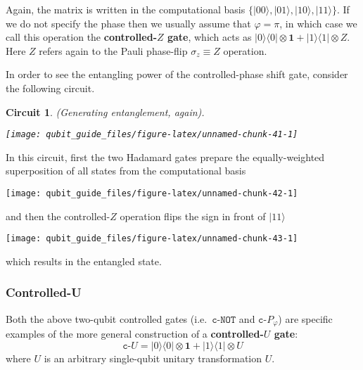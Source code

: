 \documentclass[fleqn]{article}
\newtheorem*{circuit}{Circuit}
\begin{document}
Again, the matrix is written in the computational basis \(\{|00\rangle,|01\rangle,|10\rangle,|11\rangle\}\).
If we do not specify the phase then we usually assume that \(\varphi=\pi\), in which case we call this operation the \textbf{controlled-\(Z\) gate}, which acts as \(|0\rangle\langle 0|\otimes\mathbf{1}+ |1\rangle\langle 1|\otimes Z\).
Here \(Z\) refers again to the Pauli phase-flip \(\sigma_z\equiv Z\) operation.

In order to see the entangling power of the controlled-phase shift gate, consider the following circuit.

\begin{circuit}

(Generating entanglement, again).

\begin{center}\texttt{[image: qubit\_guide\_files/figure-latex/unnamed-chunk-41-1]} \end{center}


\end{circuit}

In this circuit, first the two Hadamard gates prepare the equally-weighted superposition of all states from the computational basis

\begin{center}\texttt{[image: qubit\_guide\_files/figure-latex/unnamed-chunk-42-1]} \end{center}

and then the controlled-\(Z\) operation flips the sign in front of \(|11\rangle\)

\begin{center}\texttt{[image: qubit\_guide\_files/figure-latex/unnamed-chunk-43-1]} \end{center}

which results in the entangled state.

\hypertarget{controlled-u}{%
\subsubsection{Controlled-U}\label{controlled-u}}

Both the above two-qubit controlled gates (i.e.~\(\texttt{c-NOT}\) and \(\texttt{c-}P_\varphi\)) are specific examples of the more general construction of a \textbf{controlled-\(U\) gate}:
\[
  \texttt{c-}U
  =
  |0\rangle\langle 0|\otimes\mathbf{1}+ |1\rangle\langle 1|\otimes U
\]
where \(U\) is an arbitrary single-qubit unitary transformation \(U\).
\end{document}
